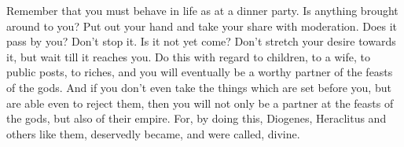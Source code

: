 Remember that you must behave in life as at a dinner party. Is
anything brought around to you? Put out your hand and take your share
with moderation. Does it pass by you? Don't stop it. Is it not yet
come? Don't stretch your desire towards it, but wait till it reaches
you. Do this with regard to children, to a wife, to public posts,
to riches, and you will eventually be a worthy partner of the feasts
of the gods. And if you don't even take the things which are set before
you, but are able even to reject them, then you will not only be a
partner at the feasts of the gods, but also of their empire. For,
by doing this, Diogenes, Heraclitus and others like them, deservedly
became, and were called, divine. 
